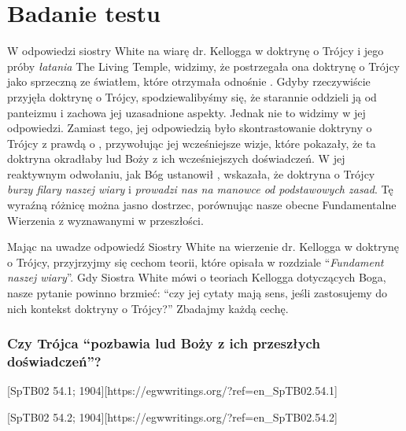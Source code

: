\chapter{Badanie testu}

W odpowiedzi siostry White na wiarę dr. Kellogga w doktrynę o Trójcy i jego próby \textit{łatania} The Living Temple, widzimy, że postrzegała ona doktrynę o Trójcy jako sprzeczną ze światłem, które otrzymała odnośnie . Gdyby rzeczywiście przyjęła doktrynę o Trójcy, spodziewalibyśmy się, że starannie oddzieli ją od panteizmu i zachowa jej uzasadnione aspekty. Jednak nie to widzimy w jej odpowiedzi. Zamiast tego, jej odpowiedzią było skontrastowanie doktryny o Trójcy z prawdą o , przywołując jej wcześniejsze wizje, które pokazały, że ta doktryna okradłaby lud Boży z ich wcześniejszych doświadczeń. W jej reaktywnym odwołaniu, jak Bóg ustanowił , wskazała, że doktryna o Trójcy \textit{burzy filary naszej wiary} i \textit{prowadzi nas na manowce od podstawowych zasad}. Tę wyraźną różnicę można jasno dostrzec, porównując nasze obecne Fundamentalne Wierzenia z  wyznawanymi w przeszłości.

Mając na uwadze odpowiedź Siostry White na wierzenie dr. Kellogga w doktrynę o Trójcy, przyjrzyjmy się cechom teorii, które opisała w rozdziale “\textit{Fundament naszej wiary}”. Gdy Siostra White mówi o teoriach Kellogga dotyczących Boga, nasze pytanie powinno brzmieć: “czy jej cytaty mają sens, jeśli zastosujemy do nich kontekst doktryny o Trójcy?” Zbadajmy każdą cechę.

\subsection*{Czy Trójca “pozbawia lud Boży z ich przeszłych doświadczeń”?}

[SpTB02 54.1; 1904][https://egwwritings.org/?ref=en\_SpTB02.54.1]

[SpTB02 54.2; 1904][https://egwwritings.org/?ref=en\_SpTB02.54.2]

